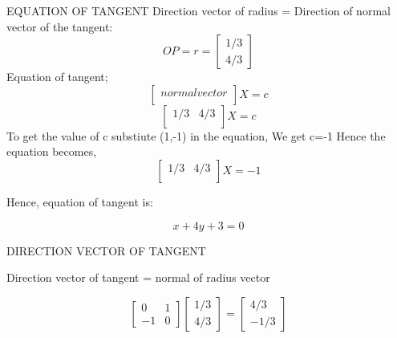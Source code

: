 \documentclass[10pt]{beamer}
\begin{document}
{\begin{frame}{EQUATION OF TANGENT}
Direction vector of radius = Direction of normal vector of the tangent:
\begin{equation}
OP=r=
\begin{bmatrix}
1/3\\
4/3
\end{bmatrix}
\end{equation}
Equation of tangent;
\begin{equation}
\begin{bmatrix}
normalvector\\
\end{bmatrix}
X=c
\end{equation}
\begin{equation}
\begin{bmatrix}
1/3 & 4/3 \\
\end{bmatrix}
X=c
\end{equation}
 To get the value of c substiute (1,-1) in the equation,
 We get c=-1
 Hence the equation becomes,
\begin{equation}
\begin{bmatrix}
1/3 & 4/3 \\
\end{bmatrix}
X=-1
\end{equation}

Hence, equation of tangent is:

\begin{equation}
x+4y+3=0    
\end{equation}
\end{frame}
\begin{frame}{DIRECTION VECTOR OF TANGENT}




Direction vector of tangent = normal of radius vector

\begin{equation}
\begin{bmatrix}
0 & 1\\
-1 & 0
\end{bmatrix}
\begin{bmatrix}
1/3\\
4/3
\end{bmatrix}
=
\begin{bmatrix}
4/3 \\
-1/3
\end{bmatrix}
\end{equation}
    
\end{frame}

}
\end{document}
